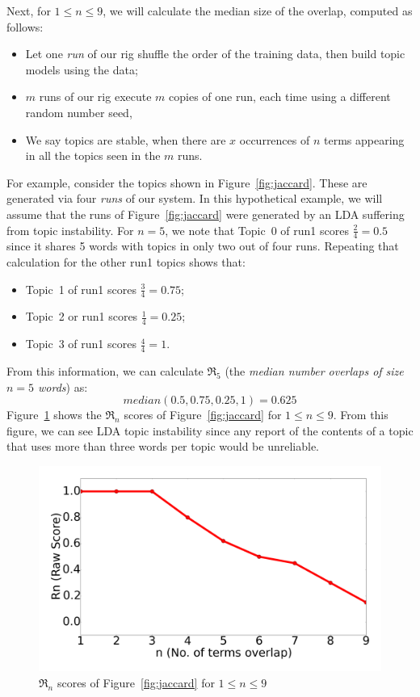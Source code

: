 \documentclass[twocolumn,5p,sort&compress]{elsarticle}
\newcommand{\bi}{\begin{itemize}}
\newcommand{\ei}{\end{itemize}}
\theoremstyle{break}
\begin{document}
Next, for $1 \le n \le 9$, we will calculate the median size of the overlap,
computed as follows:
\bi
\item Let one {\em run} of our rig shuffle the order of the training data, then build topic models using the data;
  \item $m$ runs of our rig execute $m$ copies of one run, each time using a different random number seed,
\item We say topics are stable,
when there are $x$ occurrences of  $n$ terms appearing in all the topics seen in the $m$ runs.
\ei


For example, consider the topics shown in Figure~\ref{fig:jaccard}. These are generated via four {\em runs} of our system. In this hypothetical example, we will assume that the runs of
 Figure~\ref{fig:jaccard} were generated by an LDA suffering from topic instability.
For $n=5$, we note that Topic~0 of run1 scores $\frac{2}{4}=0.5$ since it shares 5 words with topics in only two out of four runs.
Repeating that calculation for the other run1 topics shows that:
\bi
\item Topic~1 of run1 scores $\frac{3}{4}=0.75$;
\item Topic~2 or run1 scores $\frac{1}{4}=0.25$;
\item Topic~3 of run1 scores $\frac{4}{4}=1$.
  \ei
  From this information, we can calculate
  $\Re_5$  (the
  {\em median number overlaps of size $n=5$ words}) as:
  \[
   \mathit{median}(0.5, 0.75, 0.25, 1) =0.625\]
  Figure~\ref{fig:alln}
  shows the $\Re_n$ scores of 
  Figure~\ref{fig:jaccard} for $1 \le n \le 9$.  From this figure, we can see LDA topic instability
  since
  any report of the contents of a topic that uses more than three words per topic would be unreliable.

  \begin{figure}[!h]
  \includegraphics[width=\linewidth]{./fig/alln.png}
  \caption{$\Re_n$ scores of 
  Figure~\ref{fig:jaccard} for $1 \le n \le 9$}
  \label{fig:alln}
\end{figure}
\end{document}

